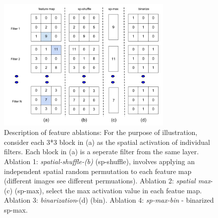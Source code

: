 \documentclass[runningheads]{llncs}
\begin{document}
\begin{figure}[t!]
\centering
\includegraphics[height=6.5cm]{images/features1.png}
\caption{Description of feature ablations: For the purpose of illustration, consider each 3*3 block in (a) as the spatial activation of individual filters. Each block in (a) is a seperate filter from the same layer. Ablation 1: \textit{spatial-shuffle-(b)} (sp-shuffle), involves applying an independent spatial random permutation to each feature map (different images see different permuations). Ablation 2: \textit{spatial max}-(c) (sp-max), select the max activation value in each featue map. Ablation 3: \textit{binarization}-(d) (bin). Ablation 4: \textit{sp-max-bin} - binarized sp-max.}
\label{fig:features}
\end{figure}
\end{document}
